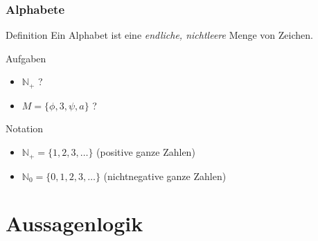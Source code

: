 \documentclass{beamer}
\begin{document}
\begin{frame}
	\frametitle{Alphabete}
	\begin{block}{Definition}
		Ein Alphabet ist eine \emph{endliche, nichtleere} Menge von Zeichen.
	\end{block}
	\begin{exampleblock}{Aufgaben}
		\begin{itemize}
			\item $\mathbb N$\(_{+}\) ?
			\item \(M=\{\phi,3,\psi,a\}\) ?
		\end{itemize}
	\end{exampleblock}
	\pause
	\begin{alertblock}{Notation}
		\begin{itemize}
			\item $\mathbb N$\(_{+}=\{1,2,3,\dots\}\) (positive ganze Zahlen)
			\item $\mathbb N$\(_{0}=\{0,1,2,3,\dots\}\) (nichtnegative ganze Zahlen)
		\end{itemize}
	\end{alertblock}
\end{frame}

\section{Aussagenlogik}
\end{document}

